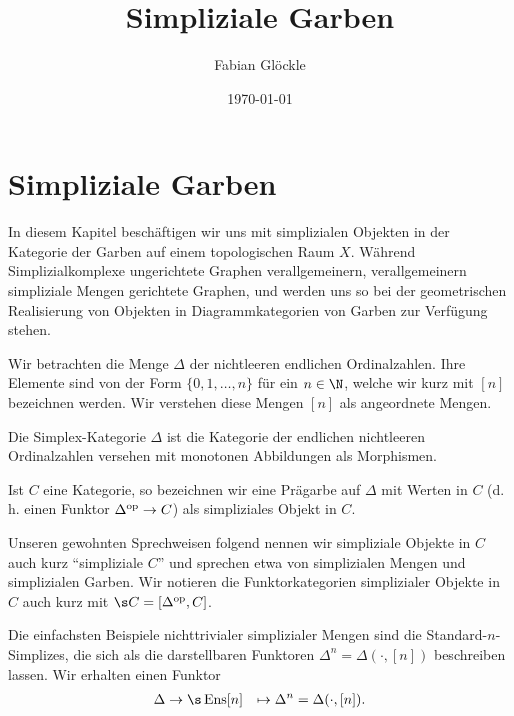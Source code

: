 



\title{Simpliziale Garben}
\author{Fabian Glöckle}
\date{\today}

\chapter{Simpliziale Garben}

In diesem Kapitel beschäftigen wir uns mit simplizialen Objekten in
der Kategorie der Garben auf einem topologischen Raum $X$. Während
Simplizialkomplexe ungerichtete Graphen verallgemeinern,
verallgemeinern simpliziale Mengen gerichtete Graphen, und werden uns
so bei der geometrischen Realisierung von Objekten in
Diagrammkategorien von Garben zur Verfügung stehen.

Wir betrachten die Menge $\Delta$ der nichtleeren endlichen
Ordinalzahlen. Ihre Elemente sind von der Form $\{0, 1, \dots, n\}$
für ein $n \in \N$, welche wir kurz mit $[n]$ bezeichnen werden. Wir
verstehen diese Mengen $[n]$ als angeordnete Mengen.

\begin{defn}
  Die Simplex-Kategorie $\Delta$ ist die Kategorie der endlichen
  nichtleeren Ordinalzahlen versehen mit monotonen Abbildungen als
  Morphismen.

  Ist $C$ eine Kategorie, so bezeichnen wir eine Prägarbe auf $\Delta$
  mit Werten in $C$ (d. h. einen Funktor $\Delta^\mathrm{op} \to C$) als
  simpliziales Objekt in $C$.
\end{defn}

Unseren gewohnten Sprechweisen folgend nennen wir simpliziale Objekte
in $C$ auch kurz ``simpliziale $C$'' und sprechen etwa von
simplizialen Mengen und simplizialen Garben. Wir notieren die
Funktorkategorien simplizialer Objekte in $C$ auch kurz mit $\s C =
[\Delta\op, C]$.


Die einfachsten Beispiele nichttrivialer simplizialer Mengen sind die
Standard-$n$-Simplizes, die sich als die darstellbaren Funktoren
$\Delta^n = \Delta(\cdot, [n])$ beschreiben lassen. Wir erhalten einen
Funktor
\begin{align*}
  \Delta &\to \s\Ens
  [n] &\mapsto \Delta^n = \Delta(\cdot, [n]).
\end{align*}

